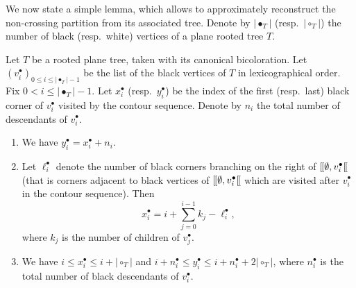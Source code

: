 \documentclass[AHL,XML,longabstracts,Unicode]{cedram}
\providecommand{\abs}[1]{\lvert#1\rvert}
\def\llbracket{[\hspace{-.10em} [ }
\begin{document}
We now state a simple lemma, which allows to approximately reconstruct  the non-crossing partition from its associated tree. Denote by $\abs{\bullet_{T}}$  (resp.~$\abs{\circ_{T}}$)  the number of black (resp.~white) vertices of a plane rooted tree $T$.


\begin{lemma}
  \label{lem:OnBlockLabels}
Let $T$ be a rooted plane tree, taken with its canonical bicoloration.  Let $ (v^{\bullet}_{i})_{0 \leq i \leq \abs{\bullet_{T}}-1 }$ be the list of the black vertices of $T$ in lexicographical order.
  Fix $ 0 < i \leq \abs{\bullet_{T}}-1$. Let $x^{\bullet}_{i}$ (resp.~$y^{\bullet}_{i}$) be the index of the first (resp.~last) black corner of $v^{\bullet}_i$ visited by the contour sequence. Denote by $n_{i}$ the total number of  descendants of $v^{\bullet}_{i}$.
 \begin{enumerate}
 \item[(i)] We have   $y^{\bullet}_{i}=x^{\bullet}_{i}+n_{i}$.
  \item[(ii)] Let $\ell_{i}^{\bullet}$ denote the number of black corners  branching on the right of  $\llbracket \emptyset, v^{\bullet}_{i} \llbracket$ (that is corners  adjacent to black vertices of $\llbracket \emptyset, v^{\bullet}_{i} \llbracket$  which are visited after $v^{\bullet}_{i}$ in the contour sequence). Then
   \[ x^{\bullet}_{i}= i+\sum_{j=0}^{i-1} k_{j} - \ell_{i}^{\bullet},\]
   where $k_{j}$ is the number of children of $v^{\bullet}_{j}$.
  \item[(iii)] We have $ i \leq x^{\bullet}_{i} \leq i+ \abs{\circ_{T}}$ and $ i +n^{\bullet}_{i}\leq y^{\bullet}_{i} \leq i+n^{\bullet}_{i}+ 2 \abs{\circ_{T}}$, where  $n^{\bullet}_{i}$ is the total number of black descendants of $v^{\bullet}_{i}$.
 \end{enumerate}
  \end{lemma}
\end{document}
